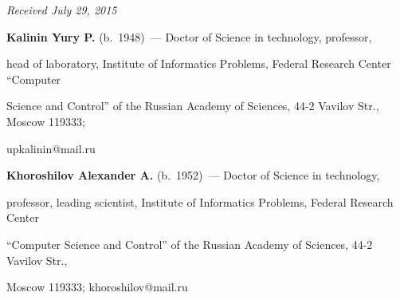 \vspace*{-3pt}





\hfill{\small\textit{Received July 29, 2015}}





\vspace*{-3pt}


     


     \Contr


     


     \vspace*{-6pt}


     


     \noindent


     \textbf{Kalinin Yury P.} (b.\ 1948)~--- Doctor of Science in technology, professor, 


head of laboratory, Institute of Informatics Problems, Federal Research Center ``Computer 


Science and Control'' of the Russian Academy of Sciences, 44-2 Vavilov Str., Moscow 119333; 


upkalinin@mail.ru


      


     \vspace*{3pt}


     


     \noindent


     \textbf{Khoroshilov Alexander A.} (b.\ 1952)~--- Doctor of Science in technology, 


professor, leading scientist, Institute of Informatics Problems, Federal Research Center 


``Computer Science and Control'' of the Russian Academy of Sciences, 44-2 Vavilov Str., 


Moscow 119333; khoroshilov@mail.ru


     


     \vspace*{3pt}


     








     \noindent


